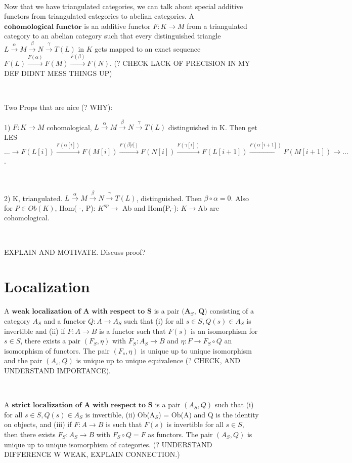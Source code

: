 \documentclass[12pt]{amsart}    %
\theoremstyle{definition}
\begin{document}
\

Now that we have triangulated categories, we can talk about special additive functors from triangulated categories to abelian categories.  A $\textbf{cohomological functor}$ is an additive functor $F: K \rightarrow M$ from a triangulated category to an abelian category such that every distinguished triangle $L \xrightarrow{\alpha} M \xrightarrow{\beta} N \xrightarrow{\gamma} T(L)$ in $K$ gets mapped to an exact sequence $F(L) \xrightarrow{F(\alpha)} F(M) \xrightarrow{F(\beta)} F(N)$. (? CHECK LACK OF PRECISION IN MY DEF DIDNT MESS THINGS UP)

\

Two Props that are nice (? WHY):
\

1) $F: K \rightarrow M$ cohomological, $L \xrightarrow {\alpha} M \xrightarrow{\beta} N \xrightarrow{\gamma} T(L)$ distinguished in K.  Then get LES $ \hdots \rightarrow F(L[i]) \xrightarrow{F(\alpha[i])} F(M[i]) \xrightarrow{F(\beta[i[)} F(N[i]) \xrightarrow{F(\gamma[i])} F(L[i+1]) \xrightarrow{F(\alpha[i+1])} F(M[i+1]) \rightarrow \hdots$.

\

2) K, triangulated. $L \xrightarrow{\alpha} M \xrightarrow{\beta} N \xrightarrow{\gamma} T(L)$, distinguished.  Then $\beta \circ \alpha = 0$. Also for $P \in Ob(K)$, Hom( -, P): $K^{op} \rightarrow$ Ab and Hom(P,-): $K \rightarrow $Ab are cohomological.

\

EXPLAIN AND MOTIVATE. Discuss proof?

\section{Localization}


A $\textbf{weak localization of A with respect to S}$ is a pair $\textbf{(A$_S$, Q)}$ consisting of a category $A_S$ and a functor $Q: A \rightarrow A_S$ such that (i) for all $s \in S, Q(s) \in A_S$ is invertible and (ii) if $F: A \rightarrow B$ is a functor such that $F(s)$ is an isomorphism for $s \in S$, there exists a pair $(F_S, \eta)$ with $F_S: A_S \rightarrow B$ and $\eta: F \rightarrow F_S \circ Q$ an isomorphism of functors.  The pair $(F_s, \eta)$ is unique up to unique isomorphism and the pair $(A_s, Q)$ is unique up to unique equivalence (? CHECK, AND UNDERSTAND IMPORTANCE).

\

A $\textbf{strict localization of A with respect to S}$ is a pair $(A_S, Q)$ such that (i) for all $s \in S, Q(s) \in A_S$ is invertible, (ii) Ob(A$_S$) = Ob(A) and Q is the identity on objects, and (iii) if $F: A \rightarrow B$ is such that $F(s)$ is invertible for all $s \in S$, then there exists $F_S: A_S \rightarrow B$ with $F_S \circ Q = F$ as functors. The pair $(A_S,Q)$ is unique up to unique isomorphism of categories.  (? UNDERSTAND DIFFERENCE W WEAK, EXPLAIN CONNECTION.)
\end{document}

